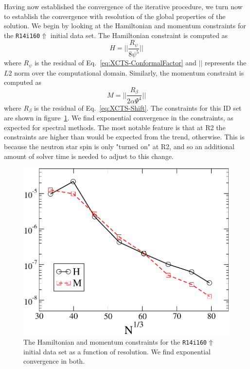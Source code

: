 Having now established the convergence of the iterative procedure, we turn now to establish the convergence with resolution of the global properties of the solution.
We begin by looking at the Hamiltonian and momentum constraints for the {\tt R14i160$\Uparrow$} initial data set.
The Hamiltonian constraint is computed as
\begin{equation}
H=||\frac{R_{\psi}}{8\psi^5}||
\end{equation}
where $R_{\psi}$ is the residual of Eq.~\ref{eq:XCTS-ConformalFactor}
and $||$ represents the $L2$ norm over the computational
domain. Similarly, the momentum constraint is computed as
\begin{equation}
M = ||\frac{R_{\beta}}{2\alpha\Psi^4}||
\end{equation}
where $R_{\beta}$ is the residual of Eq.~\ref{eq:XCTS-Shift}.
The constraints for this ID set are shown in figure~\ref{fig:HamMom}. We find exponential convergence in the constraints, as expected for spectral methods. The most notable feature
is that at {\rm R2} the constraints are higher than would be expected from the trend, otherwise. This is because the neutron star spin is only "turned on" at {\rm R2}, and so an additional amount of
solver time is needed to adjust to this change.
\begin{figure}\includegraphics[width=0.95\columnwidth]{chap4/HamMom}
\caption[Hamiltonian and momentum constraints of the {\tt R14i160$\Uparrow$} ID set]{\label{fig:HamMom} The Hamiltonian and momentum constraints for the {\tt R14i160$\Uparrow$} initial data set
as a function of resolution. We find exponential convergence in both.}
\end{figure}

